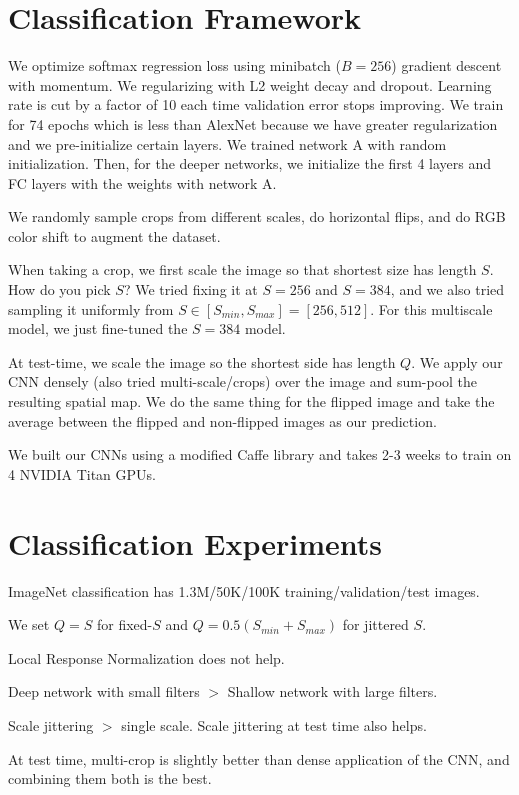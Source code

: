 \documentclass[a4paper]{article}
\begin{document}
\section{Classification Framework}
We optimize softmax regression loss using minibatch ($B = 256$) gradient descent
with momentum. We regularizing with L2 weight decay and dropout. Learning rate
is cut by a factor of 10 each time validation error stops improving. We train
for 74 epochs which is less than AlexNet because we have greater regularization
and we pre-initialize certain layers. We trained network A with random
initialization. Then, for the deeper networks, we initialize the first 4 layers
and FC layers with the weights with network A.

We randomly sample crops from different scales, do horizontal flips, and do RGB
color shift to augment the dataset.

When taking a crop, we first scale the image so that shortest size has length
$S$. How do you pick $S$? We tried fixing it at $S = 256$ and $S = 384$, and we
also tried sampling it uniformly from $S \in [S_{min}, S_{max}] = [256, 512]$.
For this multiscale model, we just fine-tuned the $S = 384$ model.

At test-time, we scale the image so the shortest side has length $Q$. We apply
our CNN densely (also tried multi-scale/crops) over the image and sum-pool
the resulting spatial map. We do the same thing for the flipped image and take
the average between the flipped and non-flipped images as our prediction.

We built our CNNs using a modified Caffe library and takes 2-3 weeks to train on
4 NVIDIA Titan GPUs.

\section{Classification Experiments}
ImageNet classification has 1.3M/50K/100K training/validation/test images.

We set $Q = S$ for fixed-$S$ and $Q = 0.5(S_{min} + S_{max})$ for jittered $S$.

Local Response Normalization does not help.

Deep network with small filters $>$ Shallow network with large filters.

Scale jittering $>$ single scale. Scale jittering at test time also helps.

At test time, multi-crop is slightly better than dense application of the CNN,
and combining them both is the best.
\end{document}
